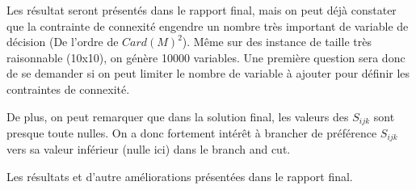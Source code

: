 \documentclass[a4paper,11pt] {article}
\begin{document}
Les résultat seront présentés dans le rapport final, mais on peut déjà constater que la contrainte de connexité engendre un nombre très important de variable de décision (De l'ordre de $Card(M)^2$). Même sur des instance de taille très raisonnable (10x10), on génère 10000 variables. Une première question sera donc de se demander si on peut limiter le nombre de variable à ajouter pour définir les contraintes de connexité.

De plus, on peut remarquer que dans la solution final, les valeurs des $S_{ijk}$ sont presque toute nulles. On a donc fortement intérêt à brancher de préférence $S_{ijk}$ vers sa valeur inférieur (nulle ici) dans le branch and cut.

Les résultats et d'autre améliorations présentées dans le rapport final.
\end{document}
